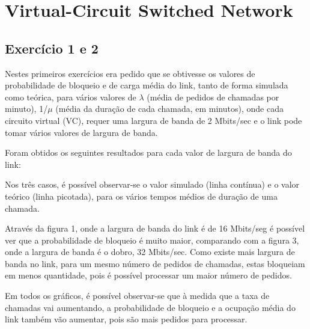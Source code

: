 \documentclass[pdftex,12pt,a4paper]{report}
\begin{document}
\renewcommand{\headrulewidth}{0pt}

\fancyhead{}
\fancyfoot{}
\rfoot{\thepage}

\renewcommand*\contentsname{Conteúdos}
\renewcommand*\figurename{Figura}
\renewcommand*\tablename{Tabela}

\tableofcontents
\renewcommand{\headrulewidth}{0.15pt}
\renewcommand{\thechapter}{}

\clearpage

\section{Virtual-Circuit Switched Network}

\subsection{Exercício 1 e 2}

Nestes primeiros exercícios era pedido que se obtivesse os valores de probabilidade de bloqueio e de carga média do link, tanto de forma simulada como teórica, para vários valores de $\lambda$ (média de pedidos de chamadas por minuto), 1/$\mu$ (média da duração de cada chamada, em minutos), onde cada circuito virtual (VC), requer uma largura de banda de 2 Mbits/sec e o link pode tomar vários valores de largura de banda.


Foram obtidos os seguintes resultados para cada valor de largura de banda do link:

Nos três casos, é possível observar-se o valor simulado (linha contínua) e o valor teórico (linha picotada), para os vários tempos médios de duração de uma chamada.

Através da figura 1, onde a largura de banda do link é de 16 Mbits/seg é possível ver que a probabilidade de bloqueio é muito maior, comparando com a figura 3, onde a largura de banda é o dobro, 32 Mbits/sec. Como existe mais largura de banda no link, para um mesmo número de pedidos de chamadas, estas bloqueiam em menos quantidade, pois é possível processar um maior número de pedidos. 

Em todos os gráficos, é possível observar-se que à medida que a taxa de chamadas vai aumentando, a probabilidade de bloqueio e a ocupação média do link também vão aumentar, pois são mais pedidos para processar.
\end{document}
